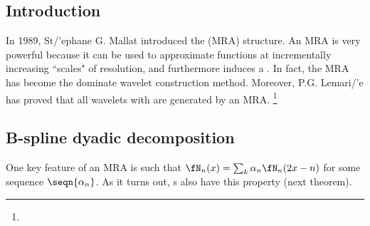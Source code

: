 \subsection{Introduction}
In 1989, St{/'e}phane G. Mallat introduced the  (MRA) structure.
An MRA is very powerful because it can be used to approximate functions at incrementally increasing ``scales" of
resolution, and furthermore induces a .
In fact, the MRA has become the dominate wavelet construction method.
Moreover, P.G. Lemari{/'e} has proved that all wavelets with  are generated by an MRA.
\footnote{
  }

\subsection{B-spline dyadic decomposition}
One key feature of an MRA is  such that $\fN_n(x)=\sum_k \alpha_n\fN_n(2x-n)$ for some
sequence $\seqn{\alpha_n}$.
As it turns out, s also have this property (next theorem).

